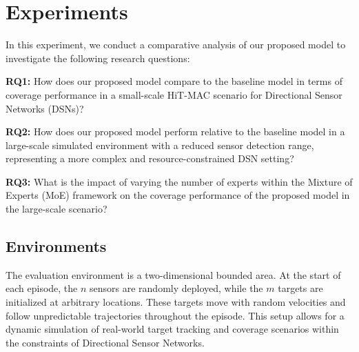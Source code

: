 \documentclass[preprint,12pt]{elsarticle}
\begin{document}



\section{Experiments}
\label{sec:experiments}
In this experiment, we conduct a comparative analysis of our proposed model to investigate the following research questions:

\noindent\textbf{RQ1:} How does our proposed model compare to the baseline model in terms of coverage performance in a small-scale HiT-MAC scenario for Directional Sensor Networks (DSNs)?

\noindent\textbf{RQ2:}  How does our proposed model perform relative to the baseline model in a large-scale simulated environment with a reduced sensor detection range, representing a more complex and resource-constrained DSN setting?

\noindent\textbf{RQ3:} What is the impact of varying the number of experts within the Mixture of Experts (MoE) framework on the coverage performance of the proposed model in the large-scale scenario?
\subsection{Environments}
The evaluation environment is a two-dimensional bounded area. At the start of each episode, the $n$ sensors are randomly deployed, while the $m$ targets are initialized at arbitrary locations. These targets move with random velocities and follow unpredictable trajectories throughout the episode. This setup allows for a dynamic simulation of real-world target tracking and coverage scenarios within the constraints of Directional Sensor Networks.
\end{document}

